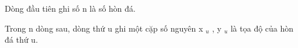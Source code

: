 Dòng đầu tiên ghi số n là số hòn đá.  

   Trong n dòng sau, dòng thứ u ghi một cặp số nguyên x   $_    u   $   , y   $_    u   $   là tọa độ của hòn đá thứ u.  

\